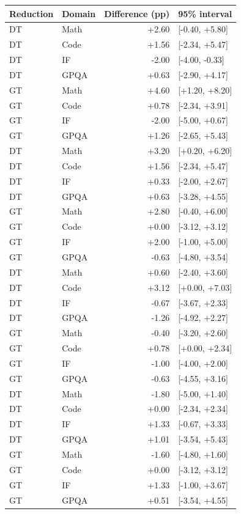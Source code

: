 \begin{tabular}{llrl}
\toprule
Reduction & Domain & Difference (pp) & 95\% interval \\
\midrule
DT & Math & +2.60 & [-0.40, +5.80] \\
DT & Code & +1.56 & [-2.34, +5.47] \\
DT & IF & -2.00 & [-4.00, -0.33] \\
DT & GPQA & +0.63 & [-2.90, +4.17] \\
GT & Math & +4.60 & [+1.20, +8.20] \\
GT & Code & +0.78 & [-2.34, +3.91] \\
GT & IF & -2.00 & [-5.00, +0.67] \\
GT & GPQA & +1.26 & [-2.65, +5.43] \\
DT & Math & +3.20 & [+0.20, +6.20] \\
DT & Code & +1.56 & [-2.34, +5.47] \\
DT & IF & +0.33 & [-2.00, +2.67] \\
DT & GPQA & +0.63 & [-3.28, +4.55] \\
GT & Math & +2.80 & [-0.40, +6.00] \\
GT & Code & +0.00 & [-3.12, +3.12] \\
GT & IF & +2.00 & [-1.00, +5.00] \\
GT & GPQA & -0.63 & [-4.80, +3.54] \\
DT & Math & +0.60 & [-2.40, +3.60] \\
DT & Code & +3.12 & [+0.00, +7.03] \\
DT & IF & -0.67 & [-3.67, +2.33] \\
DT & GPQA & -1.26 & [-4.92, +2.27] \\
GT & Math & -0.40 & [-3.20, +2.60] \\
GT & Code & +0.78 & [+0.00, +2.34] \\
GT & IF & -1.00 & [-4.00, +2.00] \\
GT & GPQA & -0.63 & [-4.55, +3.16] \\
DT & Math & -1.80 & [-5.00, +1.40] \\
DT & Code & +0.00 & [-2.34, +2.34] \\
DT & IF & +1.33 & [-0.67, +3.33] \\
DT & GPQA & +1.01 & [-3.54, +5.43] \\
GT & Math & -1.60 & [-4.80, +1.60] \\
GT & Code & +0.00 & [-3.12, +3.12] \\
GT & IF & +1.33 & [-1.00, +3.67] \\
GT & GPQA & +0.51 & [-3.54, +4.55] \\
\bottomrule
\end{tabular}
